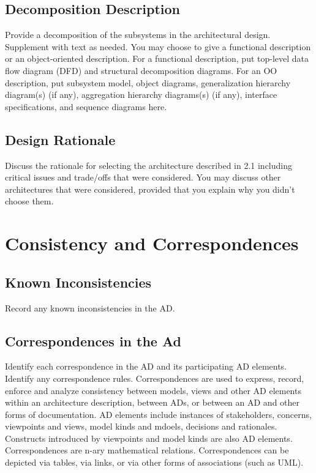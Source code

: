 \documentclass[a4paper, 12pt]{article}
\begin{document}
\subsection{Decomposition Description} \label{sec:decomp}
\begin{adjustwidth}{2em}{0pt}
Provide a decomposition of the subsystems in the architectural design. Supplement with text as needed. You may choose to give a functional description or an object-oriented description. For a functional description, put top-level data flow diagram (DFD) and structural decomposition diagrams. For an OO description, put subsystem model, object diagrams, generalization hierarchy diagram(s) (if any), aggregation hierarchy diagrams(s) (if any), interface specifications, and sequence diagrams here. 
\end{adjustwidth}

\subsection{Design Rationale} \label{sec:rationale}
\begin{adjustwidth}{2em}{0pt}
Discuss the rationale for selecting the architecture described in 2.1 including critical issues and trade/offs that were considered. You may discuss other architectures that were considered, provided that you explain why you didn’t choose them.
\end{adjustwidth}

\section{Consistency and Correspondences} \label{sec:cc}
\subsection{Known Inconsistencies} \label{sec:known}
\begin{adjustwidth}{2em}{0pt}
Record any known inconsistencies in the AD. 
\end{adjustwidth}

\subsection{Correspondences in the Ad} \label{sec:correspondences}
\begin{adjustwidth}{2em}{0pt}
Identify each correspondence in the AD and its participating AD elements. Identify any correspondence rules. Correspondences are used to express, record, enforce and analyze consistency between models, views and other AD elements within an architecture description, between ADs, or between an AD and other forms of documentation. AD elements include instances of stakeholders, concerns, viewpoints and views, model kinds and mdoels, decisions and rationales. Constructs introduced by viewpoints and model kinds are also AD elements. Correspondences are n-ary mathematical relations. Correspondences can be depicted via tables, via links, or via other forms of associations (such as UML).
\end{adjustwidth}
\end{document}
